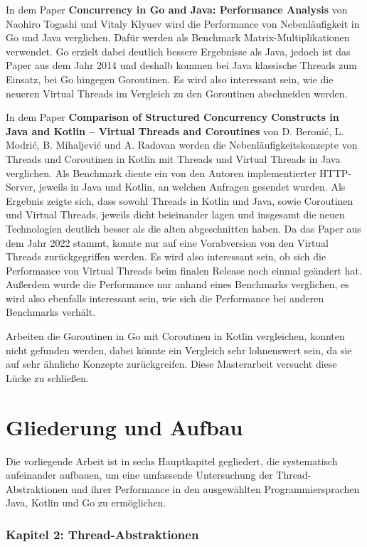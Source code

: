 \documentclass[fontsize=12pt,paper=a4,twoside=semi,parskip=half-,headsepline,headinclude]{scrreprt}
\begin{document}
In dem Paper \textbf{Concurrency in Go and Java: Performance Analysis} \cite{Togashi2014} von Naohiro Togashi und Vitaly Klyuev wird die Performance von Nebenläufigkeit in Go und Java verglichen. Dafür werden als Benchmark Matrix-Multiplikationen verwendet. Go erzielt dabei deutlich bessere Ergebnisse als Java, jedoch ist das Paper aus dem Jahr 2014 und deshalb kommen bei Java klassische Threads zum Einsatz, bei Go hingegen Goroutinen. Es wird also interessant sein, wie die neueren Virtual Threads im Vergleich zu den Goroutinen abschneiden werden.

In dem Paper \textbf{Comparison of Structured Concurrency Constructs in Java and Kotlin – Virtual Threads and Coroutines} \cite{Modric2022} von D. Beronić, L. Modrić, B. Mihaljević und A. Radovan werden die Nebenläufigkeitskonzepte von Threads und Coroutinen in Kotlin mit Threads und Virtual Threads in Java verglichen. Als Benchmark diente ein von den Autoren implementierter HTTP-Server, jeweils in Java und Kotlin, an welchen Anfragen gesendet wurden. Als Ergebnis zeigte sich, dass sowohl Threads in Kotlin und Java, sowie Coroutinen und Virtual Threads, jeweils dicht beieinander lagen und insgesamt die neuen Technologien deutlich besser als die alten abgeschnitten haben. Da das Paper aus dem Jahr 2022 stammt, konnte nur auf eine Vorabversion von den Virtual Threads zurückgegriffen werden. Es wird also interessant sein, ob sich die Performance von Virtual Threads beim finalen Release noch einmal geändert hat. Außerdem wurde die Performance nur anhand eines Benchmarks verglichen, es wird also ebenfalls interessant sein, wie sich die Performance bei anderen Benchmarks verhält.

Arbeiten die Goroutinen in Go mit Coroutinen in Kotlin vergleichen, konnten nicht gefunden werden, dabei könnte ein Vergleich sehr lohnenswert sein, da sie auf sehr ähnliche Konzepte zurückgreifen. Diese Masterarbeit versucht diese Lücke zu schließen.

\section{Gliederung und Aufbau}

Die vorliegende Arbeit ist in sechs Hauptkapitel gegliedert, die systematisch aufeinander aufbauen, um eine umfassende Untersuchung der Thread-Abstraktionen und ihrer Performance in den ausgewählten Programmiersprachen Java, Kotlin und Go zu ermöglichen.

\subsubsection{Kapitel 2: Thread-Abstraktionen}
\end{document}
